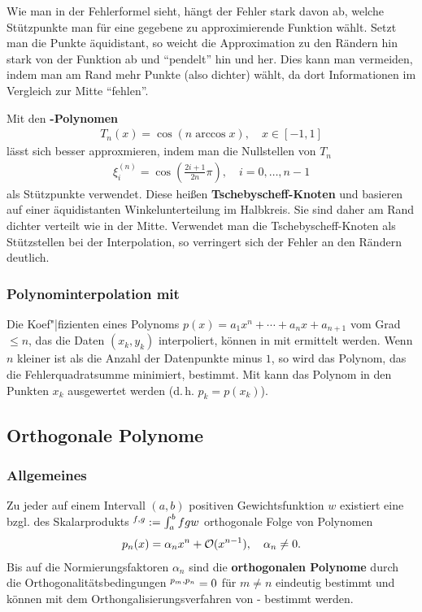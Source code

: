 \linie

Wie man in der Fehlerformel sieht, hängt der Fehler stark davon ab, welche
Stützpunkte man für eine gegebene zu approximierende Funktion wählt.
Setzt man die Punkte äquidistant, so weicht die Approximation zu den
Rändern hin stark von der Funktion ab und "`pendelt"' hin und her.
Dies kann man vermeiden, indem man am Rand mehr Punkte (also dichter) wählt,
da dort Informationen im Vergleich zur Mitte "`fehlen"'.

Mit den \textbf{-Polynomen}
\begin{align*}
    T_n(x) = \cos(n \arccos x),\quad x \in [-1, 1]
\end{align*}
lässt sich besser approxmieren, indem man die Nullstellen von $T_n$
\begin{align*}
    \xi_i^{(n)} = \cos\left(\frac{2i + 1}{2n} \pi\right),\quad
    i = 0, \dotsc, n - 1
\end{align*}
als Stützpunkte verwendet.
Diese heißen \textbf{Tschebyscheff-Knoten} und basieren auf einer äquidistanten
Winkelunterteilung im Halbkreis.
Sie sind daher am Rand dichter verteilt wie in der Mitte.
Verwendet man die Tschebyscheff-Knoten als Stützstellen bei der Interpolation,
so verringert sich der Fehler an den Rändern deutlich.

\subsubsection{%
    Polynominterpolation mit \matlab{}%
}

Die Koef"|fizienten eines Polynoms $p(x) = a_1 x^n + \dotsb + a_n x + a_{n+1}$
vom Grad $\le n$, das die Daten $(x_k, y_k)$ interpoliert, können in \matlab{}
mit  ermittelt werden.
Wenn $n$ kleiner ist als die Anzahl der Datenpunkte minus $1$, so wird das
Polynom, das die Fehlerquadratsumme minimiert, bestimmt.
Mit  kann das Polynom in den Punkten $x_k$ ausgewertet
werden (d.\,h. $p_k = p(x_k)$).

\subsection{%
    Orthogonale Polynome%
}

\subsubsection{%
    Allgemeines%
}

Zu jeder auf einem Intervall $(a, b)$ positiven Gewichtsfunktion $w$
existiert eine bzgl. des Skalarprodukts $\sp{f, g} := \int_a^b f g w$
orthogonale Folge von Polynomen
\begin{align*}
    p_n(x) = \alpha_n x^n + \mathcal{O}(x^{n-1}),\quad
    \alpha_n \not= 0.
\end{align*}
Bis auf die Normierungsfaktoren $\alpha_n$ sind die
\textbf{orthogonalen Polynome} durch die Orthogonalitätsbedingungen
$\sp{p_m, p_n} = 0$ für $m \not= n$ eindeutig bestimmt und können
mit dem Orthongalisierungsverfahren von - bestimmt
werden.

